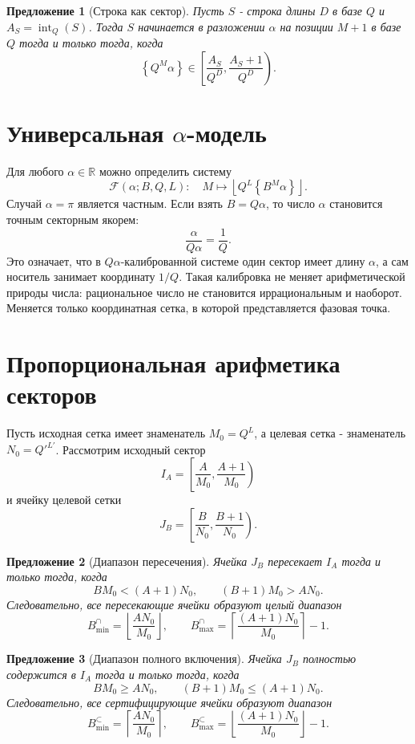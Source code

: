 \documentclass[11pt,a4paper]{article}
\newtheorem{proposition}{Предложение}
\newcommand{\fracpart}[1]{\left\{#1\right\}}
\newcommand{\floor}[1]{\left\lfloor #1 \right\rfloor}
\newcommand{\R}{\mathbb{R}}
\begin{document}
\begin{proposition}[Строка как сектор]
Пусть $S$ - строка длины $D$ в базе $Q$ и $A_S=\operatorname{int}_Q(S)$.  Тогда $S$ начинается в разложении $\alpha$ на позиции $M+1$ в базе $Q$ тогда и только тогда, когда
\[
  \fracpart{Q^M\alpha}\in \left[\frac{A_S}{Q^D},\frac{A_S+1}{Q^D}\right).
\]
\end{proposition}

\section{Универсальная $\alpha$-модель}

Для любого $\alpha\in\R$ можно определить систему
\[
  \mathcal{F}(\alpha;B,Q,L):\quad M\mapsto \floor{Q^L\fracpart{B^M\alpha}}.
\]
Случай $\alpha=\pi$ является частным.  Если взять $B=Q\alpha$, то число $\alpha$ становится точным секторным якорем:
\[
  \frac{\alpha}{Q\alpha}=\frac1Q.
\]
Это означает, что в $Q\alpha$-калиброванной системе один сектор имеет длину $\alpha$, а сам носитель занимает координату $1/Q$.  Такая калибровка не меняет арифметической природы числа: рациональное число не становится иррациональным и наоборот.  Меняется только координатная сетка, в которой представляется фазовая точка.

\section{Пропорциональная арифметика секторов}

Пусть исходная сетка имеет знаменатель $M_0=Q^L$, а целевая сетка - знаменатель $N_0=Q'^{L'}$.  Рассмотрим исходный сектор
\[
  I_A=\left[\frac{A}{M_0},\frac{A+1}{M_0}\right)
\]
и ячейку целевой сетки
\[
  J_B=\left[\frac{B}{N_0},\frac{B+1}{N_0}\right).
\]

\begin{proposition}[Диапазон пересечения]
Ячейка $J_B$ пересекает $I_A$ тогда и только тогда, когда
\[
  B M_0 < (A+1)N_0,
  \qquad
  (B+1)M_0 > A N_0.
\]
Следовательно, все пересекающие ячейки образуют целый диапазон
\[
  B_{\min}^{\cap}=\left\lfloor\frac{A N_0}{M_0}\right\rfloor,
  \qquad
  B_{\max}^{\cap}=\left\lceil\frac{(A+1)N_0}{M_0}\right\rceil-1.
\]
\end{proposition}

\begin{proposition}[Диапазон полного включения]
Ячейка $J_B$ полностью содержится в $I_A$ тогда и только тогда, когда
\[
  B M_0\ge A N_0,
  \qquad
  (B+1)M_0\le (A+1)N_0.
\]
Следовательно, все сертифицирующие ячейки образуют диапазон
\[
  B_{\min}^{\subset}=\left\lceil\frac{A N_0}{M_0}\right\rceil,
  \qquad
  B_{\max}^{\subset}=\left\lfloor\frac{(A+1)N_0}{M_0}\right\rfloor-1.
\]
\end{proposition}
\end{document}
